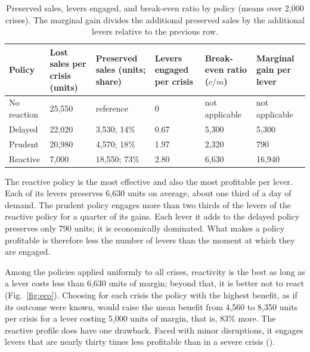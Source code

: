\begin{table}[htbp]
\caption{Preserved sales, levers engaged, and break-even ratio by policy (means over 2,000 crises). The marginal gain divides the additional preserved sales by the additional levers relative to the previous row.}
\label{tab:eco}
\footnotesize
\begin{tabularx}{\textwidth}{@{}LLLLLL@{}}
\toprule
\textbf{Policy} & \textbf{Lost sales per crisis (units)} & \textbf{Preserved sales (units; share)} & \textbf{Levers engaged per crisis} & \textbf{Break-even ratio ($c/m$)} & \textbf{Marginal gain per lever} \\
\midrule
No reaction & 25,550 & reference & 0 & not applicable & not applicable \\
Delayed & 22,020 & 3,530; 14\% & 0.67 & 5,300 & 5,300 \\
Prudent & 20,980 & 4,570; 18\% & 1.97 & 2,320 & 790 \\
Reactive & 7,000 & 18,550; 73\% & 2.80 & 6,630 & 16,940 \\
\bottomrule
\end{tabularx}
\end{table}

The reactive policy is the most effective and also the most profitable per lever. Each of its levers preserves 6,630 units on average, about one third of a day of demand. The prudent policy engages more than two thirds of the levers of the reactive policy for a quarter of its gains. Each lever it adds to the delayed policy preserves only 790 units; it is economically dominated. What makes a policy profitable is therefore less the number of levers than the moment at which they are engaged.

\begin{center}

\label{fig:eco}
\end{center}

Among the policies applied uniformly to all crises, reactivity is the best as long as a lever costs less than 6,630 units of margin; beyond that, it is better not to react (Fig.~\ref{fig:eco}). Choosing for each crisis the policy with the highest benefit, as if its outcome were known, would raise the mean benefit from 4,560 to 8,350 units per crisis for a lever costing 5,000 units of margin, that is, 83\% more. The reactive profile does have one drawback. Faced with minor disruptions, it engages levers that are nearly thirty times less profitable than in a severe crisis ().
